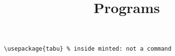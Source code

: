 \documentclass{article}
\title{Programs}
\begin{document}

\begin{verbatim}
\usepackage{tabu} % inside minted: not a command
\end{verbatim}
\end{document}
